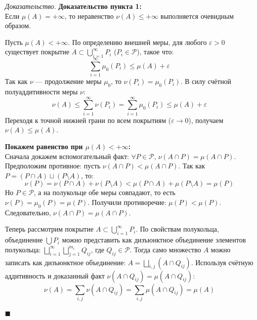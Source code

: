 \documentclass[12pt,a4paper]{article}
\newenvironment{Proof}[1][Доказательство]{\vspace{0.5em}\noindent\textit{#1.}\hspace{0.5em}\ignorespaces}{\hfill$\blacksquare$\vspace{1em}}
\begin{document}
\begin{Proof}
\textbf{Доказательство пункта 1:} \\
Если $\mu(A) = +\infty$, то неравенство $\nu(A) \le +\infty$ выполняется очевидным образом.

Пусть $\mu(A) < +\infty$. По определению внешней меры, для любого $\varepsilon > 0$ существует покрытие $A \subset \bigcup\limits_{i=1}^{\infty} P_i$ ($P_i \in \mathcal{P}$), такое что:
$$ \sum\limits_{i=1}^{\infty} \mu_0(P_i) \le \mu(A) + \varepsilon $$
Так как $\nu$ — продолжение меры $\mu_0$, то $\nu(P_i) = \mu_0(P_i)$. В силу счётной полуаддитивности меры $\nu$:
$$ \nu(A) \le \sum\limits_{i=1}^{\infty} \nu(P_i) = \sum\limits_{i=1}^{\infty} \mu_0(P_i) \le \mu(A) + \varepsilon $$
Переходя к точной нижней грани по всем покрытиям ($\varepsilon \to 0$), получаем $\nu(A) \le \mu(A)$.

\textbf{Покажем равенство при $\mu(A) < +\infty$:} \\
Сначала докажем вспомогательный факт: $\forall P \in \mathcal{P}$, $\nu(A \cap P) = \mu(A \cap P)$. \\
Предположим противное: пусть $\nu(A \cap P) < \mu(A \cap P)$. Так как $P = (P \cap A) \sqcup (P \setminus A)$, то:
$$ \nu(P) = \nu(P \cap A) + \nu(P \setminus A) < \mu(P \cap A) + \mu(P \setminus A) = \mu(P) $$
Но $P \in \mathcal{P}$, а на полукольце обе меры совпадают, то есть $\nu(P) = \mu_0(P) = \mu(P)$. Получили противоречие: $\mu(P) < \mu(P)$. Следовательно, $\nu(A \cap P) = \mu(A \cap P)$.

Теперь рассмотрим покрытие $A \subset \bigcup\limits_{i=1}^{\infty} P_i$. По свойствам полукольца, объединение $\bigcup P_i$ можно представить как дизъюнктное объединение элементов полукольца: $\bigsqcup\limits_{i=1}^{\infty} \bigsqcup\limits_{j=1}^{m_i} Q_{ij}$, где $Q_{ij} \in \mathcal{P}$.
Тогда само множество $A$ можно записать как дизъюнктное объединение: $A = \bigsqcup\limits_{i, j} (A \cap Q_{ij})$.
Используя счётную аддитивность и доказанный факт $\nu(A \cap Q_{ij}) = \mu(A \cap Q_{ij})$:
$$ \nu(A) = \sum\limits_{i, j} \nu(A \cap Q_{ij}) = \sum\limits_{i, j} \mu(A \cap Q_{ij}) = \mu(A) $$


\end{Proof}
\end{document}
